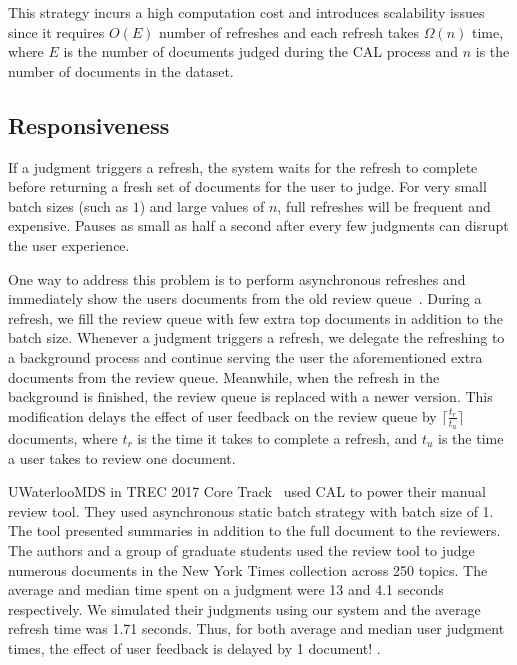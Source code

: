 This strategy incurs a high computation cost and introduces scalability issues
since it requires $O(E)$ number of refreshes and each refresh takes $\Omega(n)$
time, where $E$ is the number of documents judged during the CAL process and
$n$ is the number of documents in the dataset.

\subsection{Responsiveness}
If a judgment triggers a refresh, the system waits for the refresh to complete
before returning a fresh set of documents for the user to judge.
For very small batch sizes (such as $1$) and large values of $n$, full refreshes
will be frequent and expensive. Pauses as small as half a second after every few
judgments can disrupt the user experience.

One way to address this problem is to perform asynchronous refreshes and
immediately show the users documents from the old review
queue~\cite{sigirdemo}. During a refresh, we fill the review queue
with few extra top documents in addition to the batch size. Whenever a judgment
triggers a refresh, we delegate the refreshing to a background process and
continue serving the user the aforementioned extra documents from the review
queue. Meanwhile, when the refresh in the background is finished, the review
queue is replaced with a newer version. This modification delays the effect of
user feedback on the review queue by $\lceil\frac{t_r}{t_u}\rceil$ documents,
where $t_r$ is the time it takes to complete a refresh, and $t_u$ is the time a
user takes to review one document.

UWaterlooMDS in TREC 2017 Core Track~\cite{zhang2017uwaterloomds} used CAL to
power their manual review tool.  They used asynchronous static batch strategy
with batch size of 1. The tool presented summaries in addition to the full
document to the reviewers.  The authors and a group of graduate students used
the review tool to judge numerous documents in the New York Times collection
across 250 topics. The average and median time spent on a judgment were 13 and
4.1 seconds respectively. We simulated their judgments using our system and the
average refresh time was 1.71 seconds. Thus, for both average and median user
judgment times, the effect of user feedback is delayed by 1 document! .

